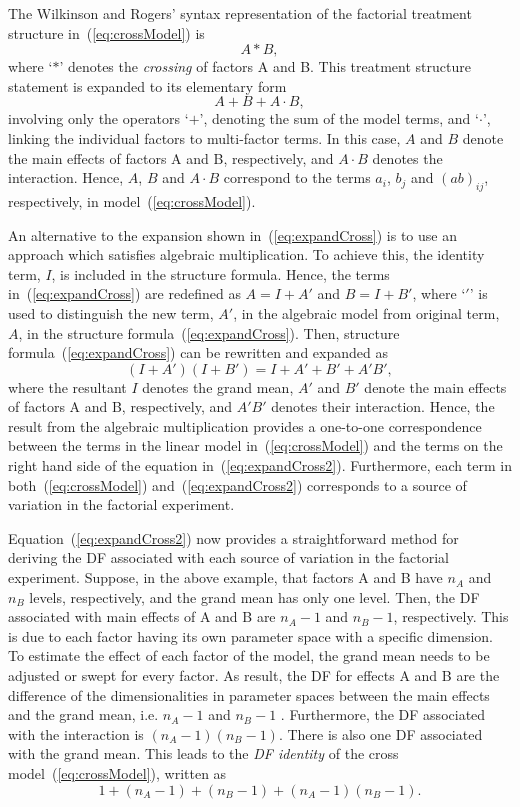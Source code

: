\documentclass[article]{jss}
\begin{document}
The Wilkinson and Rogers' syntax representation of the factorial treatment structure in~(\ref{eq:crossModel}) is
\[
A*B,
\]
where `$*$' denotes the \emph{crossing} of factors A and B. This treatment structure statement is expanded to its elementary form
\begin{equation}\label{eq:expandCross}
A + B +A\cdot B,
\end{equation}
involving only the operators `$+$', denoting the sum of the model terms, and `$\cdot$', linking the individual factors to multi-factor terms. In this case, $A$ and $B$ denote the main effects of factors A and B, respectively, and $A\cdot B$ denotes the interaction. Hence, $A$, $B$ and $A\cdot B$ correspond to the terms $a_{i}$, $b_{j}$ and $(ab)_{ij}$, respectively, in model~(\ref{eq:crossModel}).

An alternative to the expansion shown in~(\ref{eq:expandCross}) is to use an approach which satisfies algebraic multiplication. To achieve this, the identity term, $I$, is included in the structure formula. Hence, the terms in~(\ref{eq:expandCross}) are redefined as $A=I+A'$ and $B=I+B'$, where `$'$' is used to distinguish the new term, $A'$, in the algebraic model from original term, $A$, in the structure formula~(\ref{eq:expandCross}). Then, structure formula~(\ref{eq:expandCross}) can be rewritten and expanded as
\begin{equation}\label{eq:expandCross2}
(I + A')(I + B') = I + A' + B' + A'B',
\end{equation}
where the resultant $I$ denotes the grand mean, $A'$ and $B'$ denote the main effects of factors A and B, respectively, and $A'B'$ denotes their interaction. Hence, the result from the algebraic multiplication provides a one-to-one correspondence between the terms in the linear model in~(\ref{eq:crossModel}) and the terms on the right hand side of the equation in~(\ref{eq:expandCross2}). Furthermore, each term in both~(\ref{eq:crossModel}) and~(\ref{eq:expandCross2}) corresponds to a source of variation in the factorial experiment.

Equation~(\ref{eq:expandCross2}) now provides a straightforward method for deriving the DF associated with each source of variation in the factorial experiment. Suppose, in the above example, that factors A and B have $n_A$ and $n_B$ levels, respectively, and the grand mean has only one level. Then, the DF associated with main effects of A and B are $n_A - 1$ and $n_B - 1$, respectively. This is due to each factor having its own parameter space with a specific dimension. To estimate the effect of each factor of the model, the grand mean needs to be adjusted or swept for every factor. As result, the DF for effects A and B are the difference of the dimensionalities in parameter spaces between the main effects and the grand mean, i.e. $n_A - 1$ and $n_B - 1$ \citep{Good1973}. Furthermore, the DF associated with the interaction is $(n_A - 1)(n_B - 1)$. There is also one DF associated with the grand mean. This leads to the \emph{DF identity} of the cross model~(\ref{eq:crossModel}), written as 
\begin{equation}\label{eq:crossDF}
1 + (n_A - 1) + (n_B - 1) + (n_A - 1)(n_B - 1).
\end{equation} 
\end{document}
